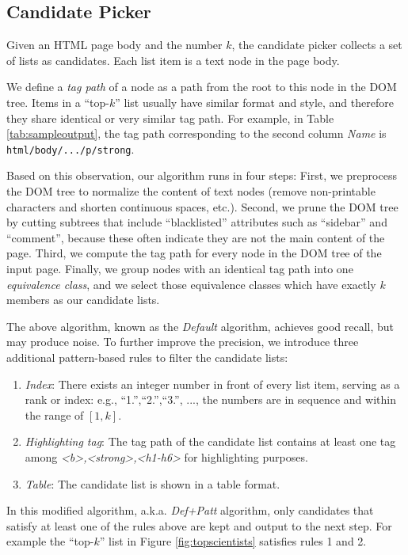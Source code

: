 \subsection{Candidate Picker}
\label{sec:picker}
Given an HTML page body and the number $k$,
the candidate picker collects a set of lists as candidates.
Each list item is a text node in the page body.

We define a {\em tag path} of a node as a path from the root to this node
in the DOM tree.
Items in a ``top-$k$'' list usually have similar format and style,
and therefore they share identical or very similar tag path.
For example, in Table \ref{tab:sampleoutput},
the tag path corresponding to the second column {\em Name} is
{\tt html/body/.../p/strong}.

Based on this observation, our algorithm runs in four steps:
First, we preprocess the DOM tree to normalize the content of text nodes
(remove non-printable characters and shorten continuous spaces, etc.).
Second, we prune the DOM tree by cutting subtrees that include ``blacklisted''
attributes such as ``sidebar'' and ``comment'', because these often indicate
they are not the main content of the page.
Third, we compute the tag path for every node in the DOM tree of the
input page. Finally, we group nodes with an identical tag path into
one {\em equivalence class}, and we
select those equivalence classes which have exactly $k$ members as our
candidate lists.

The above algorithm, known as the {\em Default} algorithm, achieves good
recall, but may produce noise. To further improve the precision,
we introduce three additional pattern-based rules to filter the candidate lists:

\begin{enumerate}
\item \textit{Index}:
There exists an integer number in front of every list item, serving as
a rank or index: e.g., ``1.'',``2.'',``3.'', ..., the numbers are in sequence
and within the range of $[1, k]$.

\item \textit{Highlighting tag}:
The tag path of the candidate list contains at least one tag
among {\em <b>,<strong>,<h1-h6>} for highlighting purposes.

\item \textit{Table}:
The candidate list is shown in a table format.
\end{enumerate}

In this modified algorithm, a.k.a. {\em Def+Patt} algorithm,
only candidates that satisfy at least one of the rules above are
kept and output to the next step.
For example the ``top-$k$'' list in Figure \ref{fig:topscientists}
satisfies rules 1 and 2.

